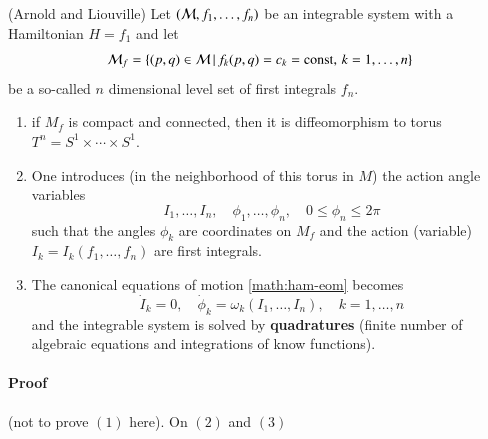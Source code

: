 \begin{theorem} (Arnold and Liouville)
	Let $(\mathcal{M}, f_1, \dots, f_n)$ be an integrable system with a Hamiltonian $H=f_1$ and let	
	\begin{equation*}
		\mathcal{M}_f = \left\{ (p, q) \in \mathcal{M} \, |\, f_k (p, q) = c_k = \text{const},\, k=1, \dots, n \right\} 	
	\end{equation*}
	be a so-called $n$ dimensional level set of first integrals $f_n$.
	\begin{enumerate}
		\item if $M_f$ is compact and connected, then it is diffeomorphism to torus $T^n = S^1 \times \cdots \times S^1$.
		\item One introduces (in the neighborhood of this torus in $M$) the action angle variables 
			\begin{equation*}
				I_1, \dots, I_n, \quad \phi_1, \dots, \phi_n, \quad 0 \leq \phi_n \leq 2\pi	
			\end{equation*}
			such that the angles $\phi_k$ are coordinates on $M_f$ and the action (variable) $I_k=I_k(f_1, \dots, f_n)$ are first integrals.
		\item The canonical equations of motion \eqref{math:ham-eom} becomes
			\begin{equation}
				\dot{I}_k = 0, \quad \dot{\phi}_k = \omega_k (I_1, \dots, I_n), \quad k =1, \dots,n 
				\label{math:action-angle-eom}
			\end{equation}
			and the integrable system is solved by \textbf{quadratures} (finite number of algebraic equations and integrations of know functions).
	\end{enumerate}
\end{theorem}

\paragraph{Proof} (not to prove $(1)$ here). On $(2)$ and $(3)$

